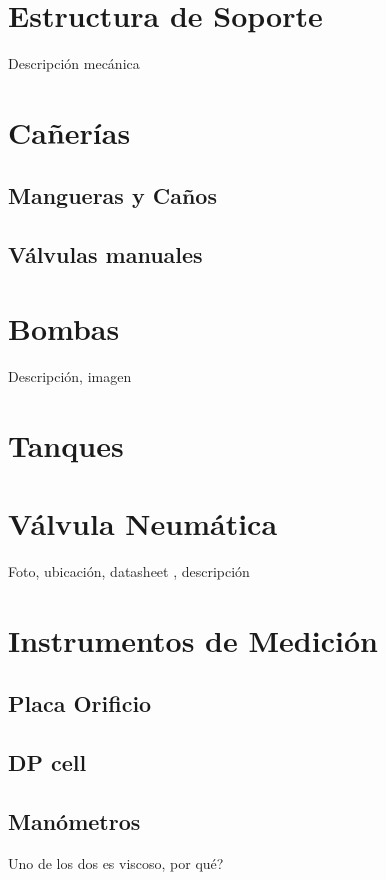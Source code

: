 \section{Estructura de Soporte}
\label{sec:EstructuraSoporte}
Descripción mecánica

\section{Cañerías}
\label{sec:Canerias}
\subsection{Mangueras y Caños}
\subsection{Válvulas manuales}

\section{Bombas}
\label{sec:Bombas}
Descripción, imagen

\section{Tanques}
\label{sec:Tanques}

\section{Válvula Neumática}
\label{sec:ValvulaNeumatica}
Foto, ubicación, datasheet , descripción

\section{Instrumentos de Medición}
\label{sec:InstrumentosMedicion}
\subsection{Placa Orificio}
\label{subsec:PlacaOrificio}

\subsection{DP cell}
\label{subsec:DPCell}

\subsection{Manómetros}
\label{subsec:Manometros}
Uno de los dos es viscoso, por qué? 
